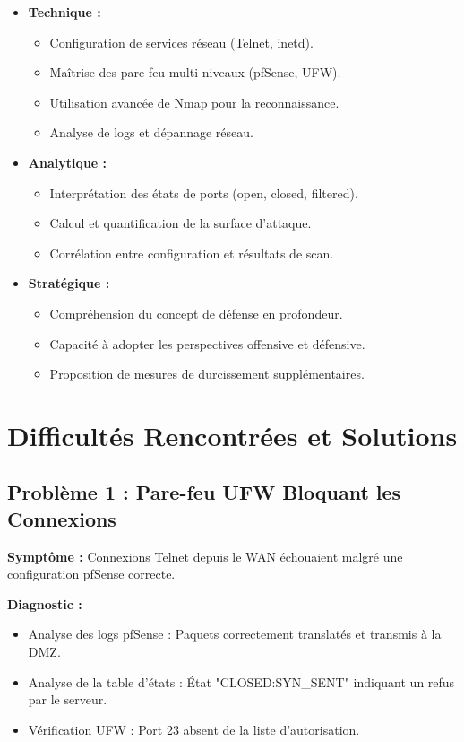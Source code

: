 \documentclass[12pt,a4paper,openany]{report}
\begin{document}
	\begin{itemize}
		\item \textbf{Technique :}
		\begin{itemize}
			\item Configuration de services réseau (Telnet, inetd).
			\item Maîtrise des pare-feu multi-niveaux (pfSense, UFW).
			\item Utilisation avancée de Nmap pour la reconnaissance.
			\item Analyse de logs et dépannage réseau.
		\end{itemize}
		
		\item \textbf{Analytique :}
		\begin{itemize}
			\item Interprétation des états de ports (open, closed, filtered).
			\item Calcul et quantification de la surface d'attaque.
			\item Corrélation entre configuration et résultats de scan.
		\end{itemize}
		
		\item \textbf{Stratégique :}
		\begin{itemize}
			\item Compréhension du concept de défense en profondeur.
			\item Capacité à adopter les perspectives offensive et défensive.
			\item Proposition de mesures de durcissement supplémentaires.
		\end{itemize}
	\end{itemize}
	
	\section{Difficultés Rencontrées et Solutions}
	
	\subsection{Problème 1 : Pare-feu UFW Bloquant les Connexions}
	\textbf{Symptôme :} Connexions Telnet depuis le WAN échouaient malgré une configuration pfSense correcte.
	
	\textbf{Diagnostic :}
	\begin{itemize}
		\item Analyse des logs pfSense : Paquets correctement translatés et transmis à la DMZ.
		\item Analyse de la table d'états : État "CLOSED:SYN\_SENT" indiquant un refus par le serveur.
		\item Vérification UFW : Port 23 absent de la liste d'autorisation.
	\end{itemize}
	
\end{document}
